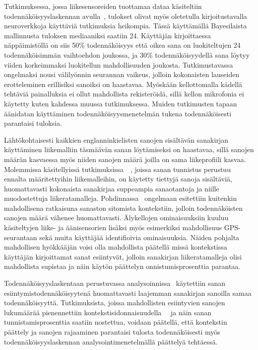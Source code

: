 \documentclass[finnish]{tktltiki2}
\theoremstyle{definition}
\theoremstyle{remark}
\begin{document}
Tutkimuksessa, jossa liikesensoreiden tuottamaa dataa käsiteltiin todennäköisyyslaskennan avulla~\cite{mole}, tulokset olivat myös oletetulla kirjoitustavalla neuroverkkoja käyttäviä tutkimuksia heikompia. Tässä käyttämällä Bayesilaista mallinnusta tuloksen mediaaniksi saatiin 24. Käyttäjän kirjoittaessa näppäimistöllä on siis 50\% todennäköisyys että oikea sana on luokiteltujen 24 todennäköisimmän vaihtoehdon joukossa, ja 30\% todennäköisyydellä sana löytyy viiden korkeimmaksi luokitellun mahdollisuuden joukosta. Tutkimustavassa ongelmaksi nousi välilyönnin seurannan vaikeus, jolloin kokonaisten lauseiden erotteleminen erillisiksi sanoiksi on haastavaa. Myöskään kellottomalla kädellä tehtäviä painalluksia ei ollut mahdollista rekisteröidä, sillä kellon mikrofonia ei käytetty kuten kahdessa muussa tutkimuksessa. Muiden tutkimusten tapaan äänidatan käyttäminen todennäköisyysmenetelmän tukena todennäköisesti parantaisi tuloksia.

Lähtökohtaisesti kaikkien englanninkielisten sanojen sisältävän sanakirjan käyttäminen liikemalliin täsmäävän sanan löytämiseksi on haastavaa, sillä sanojen määrän kasvaessa myös niiden sanojen määrä joilla on sama liikeprofiili kasvaa. Molemmissa käsitellyissä tutkimuksissa~\cite{maiti}~\cite{liu}, joissa sanan tunnistus perustuu ennalta määritettyihin liikemalleihin, on käytetty tiettyjä sanoja sisältäviä, huomattavasti kokonaista sanakirjaa suppeampia sanaotantoja ja niille muodostettuja liikeratamalleja. Pohdinnassa~\cite{liu} ongelmaan esitettiin kuitenkin mahdollisena ratkaisuna sanaston sitomista kontekstiin, jolloin todennäköisten sanojen määrä vähenee huomattavasti. Älykellojen ominaisuuksiin kuuluu käsiteltyjen liike- ja äänisensorien lisäksi myös esimerkiksi mahdollisuus GPS-seurantaan sekä muita käyttäjää identifioivia ominaisuuksia. Näiden pohjalta mahdollisen hyökkääjän voisi olla mahdollista päätellä missä kontekstissa käyttäjän kirjoittamat sanat esiintyvät, jolloin sanakirjan liikeratamalleja olisi mahdollista supistaa ja näin käytön päättelyn onnistumisprosenttia parantaa. 

Todennäköisyyslaskentaan perustuvassa analysoinnissa~\cite{mole} käytettiin sanan esiintymistodennäköisyytenä huomattavasti laajemman sanakirjan sanoilla samaa todennäköisyyttä. Tutkimuksista, joissa mahdollisten esiintyvien sanojen lukumäärää pienennettiin kontekstisidonnaisuudella~\cite{liu}~\cite{mar} ja näin sanan tunnistamisprosenttia saatiin nostettua, voidaan päätellä, että kontekstin päättely ja sanojen rajaaminen parantaisi tulosta todennäköisesti myös todennäköisyyslaskennan analysointimenetelmällä päättelyä tehtäessä. 
\end{document}
